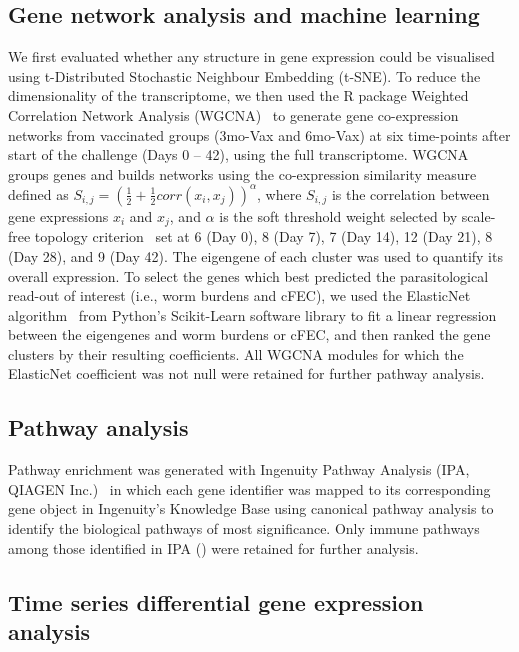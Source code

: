 \documentclass[a4paper, hidelinks, 11pt]{article}
\begin{document}
\subsection{Gene network analysis and machine learning}

We first evaluated whether any structure in gene expression could be
visualised using t-Distributed Stochastic Neighbour Embedding (t-SNE). To
reduce the dimensionality of the transcriptome, we then used the R package
Weighted Correlation Network Analysis (WGCNA)~\supercite{Langfelder2008} to
generate gene co-expression networks from vaccinated groups (3mo-Vax and
6mo-Vax) at six time-points after start of the challenge (Days 0 – 42), using
the full transcriptome. WGCNA groups genes and builds networks using the
co-expression similarity measure defined as \(
S_{i,j}=\left(\frac{1}{2}+\frac{1}{2}corr\left(x_i, x_j\right)\right)^\alpha
\), where \(S_{i,j}\) is the correlation between gene expressions \(x_i\) and
\(x_j\), and \(\alpha\) is the soft threshold weight selected by scale-free
topology criterion~\supercite{Zhang2005,Langfelder2008} set at 6 (Day 0), 8 (Day
7), 7 (Day 14), 12 (Day 21), 8 (Day 28), and 9 (Day 42). The eigengene of
each cluster was used to quantify its overall expression. To select the genes
which best predicted the parasitological read-out of interest (i.e., worm
burdens and cFEC), we used the ElasticNet algorithm~\supercite{Zou2005a} from
Python’s Scikit-Learn software library to fit a linear regression between the
eigengenes and worm burdens or cFEC, and then ranked the gene clusters by
their resulting coefficients. All WGCNA modules for which the ElasticNet
coefficient was not null were retained for further pathway analysis.

\subsection{Pathway analysis}

Pathway enrichment was generated with Ingenuity Pathway Analysis (IPA, QIAGEN
Inc.)~\supercite{Kramer2014} in which each gene identifier was mapped to its
corresponding gene object in Ingenuity’s Knowledge Base using canonical
pathway analysis to identify the biological pathways of most significance.
Only immune pathways among those identified in IPA ()
were retained for further analysis.

\subsection{Time series differential gene expression analysis}
\end{document}
